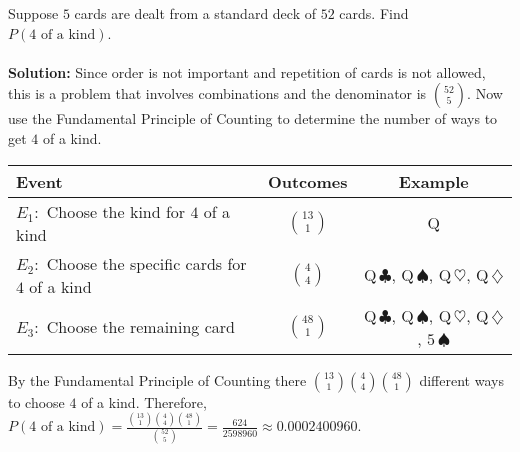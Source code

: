 \documentclass[12pt]{article}%
\newcommand{\FPC}{Fundamental Principle of Counting }
\begin{document}
\noindent Suppose $5$ cards are dealt from a standard deck of $52$ cards. Find
$P(4 \mbox{ of a kind})$.\\\\
\textbf{Solution:} Since order is not important and repetition of 
cards is not allowed, this is a problem that involves combinations and
the denominator is $\binom{52}{5}$. Now use the \FPC to determine the number
of ways to get $4$ of a kind. 
\begin{center}
\begin{tabular}{lcc}
Event & Outcomes & Example\\
\hline
$E_1:$ Choose the kind for $4$ of a kind & $\binom{13}{1}$ & Q \\
$E_2:$ Choose the specific cards for $4$ of a kind & $\binom{4}{4}$ & 
Q\,$\clubsuit$, Q\,$\spadesuit$, Q\,$\heartsuit$, Q\,$\diamondsuit$\\
$E_3:$ Choose the remaining card & $\binom{48}{1}$ & 
Q\,$\clubsuit$, Q\,$\spadesuit$, Q\,$\heartsuit$, Q\,$\diamondsuit$, 
$5\,\spadesuit$\\
\end{tabular}
\end{center}
By the \FPC there $\binom{13}{1}\binom{4}{4}\binom{48}{1}$ different
ways to choose $4$ of a kind. Therefore, $P(4 \mbox{ of a kind})=\frac{\binom{13}{1}\binom{4}{4}\binom{48}{1}}{\binom{52}{5}}=\frac{624}{2598960} \approx 0.0002400960$.\\\\
\end{document}
